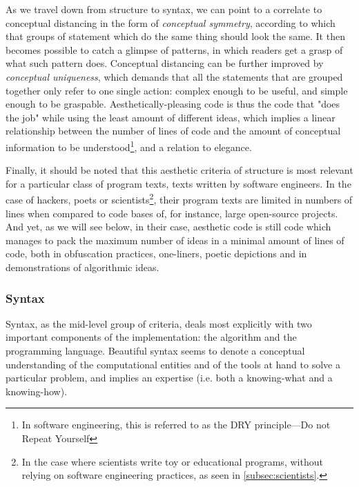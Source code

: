 As we travel down from structure to syntax, we can point to a correlate to conceptual distancing in the form of \emph{conceptual symmetry}, according to which that groups of statement which do the same thing should look the same. It then becomes possible to catch a glimpse of patterns, in which readers get a grasp of what such pattern does. Conceptual distancing can be further improved by \emph{conceptual uniqueness}, which demands that all the statements that are grouped together only refer to one single action: complex enough to be useful, and simple enough to be graspable. Aesthetically-pleasing code is thus the code that "does the job" while using the least amount of different ideas, which implies a linear relationship between the number of lines of code and the amount of conceptual information to be understood\footnote{In software engineering, this is referred to as the DRY principle—Do not Repeat Yourself\citep{martin_clean_2008}}, and a relation to elegance.

Finally, it should be noted that this aesthetic criteria of structure is most relevant for a particular class of program texts, texts written by software engineers. In the case of hackers, poets or scientists\footnote{In the case where scientists write toy or educational programs, without relying on software engineering practices, as seen in \autoref{subsec:scientists}.}, their program texts are limited in numbers of lines when compared to code bases of, for instance, large open-source projects. And yet, as we will see below, in their case, aesthetic code is still code which manages to pack the maximum number of ideas in a minimal amount of lines of code, both in obfuscation practices, one-liners, poetic depictions and in demonstrations of algorithmic ideas.

\subsubsection{Syntax}
\label{subsubsec:framework-syntax}

Syntax, as the mid-level group of criteria, deals most explicitly with two important components of the implementation: the algorithm and the programming language. Beautiful syntax seems to denote a conceptual understanding of the computational entities and of the tools at hand to solve a particular problem, and implies an expertise (i.e. both a knowing-what and a knowing-how).

